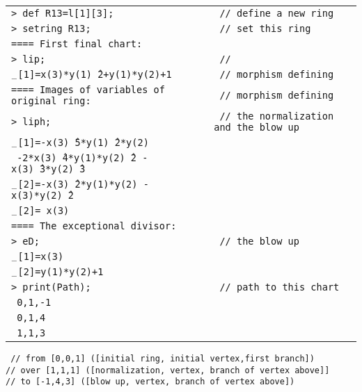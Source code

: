 \documentclass{article}
\begin{document}
\begin{table}[htbp]
	\begin{tabular}{ll}
		\texttt{> def R13=l[1][3]; } &     \texttt{ // define a new ring} \\
		\texttt{> setring R13;}  &  \texttt{ // set this ring}  \\
		\texttt{==== First final chart:}  &   \\
		\texttt{> lip;}  &  \texttt{ // }  \\
		\texttt{$_{-}$[1]=x(3)*y(1)\^\ \hspace*{-0.1cm}2+y(1)*y(2)+1}  & \texttt{ // morphism defining}   \\
		\texttt{==== Images of variables of original ring:}  & \texttt{ // morphism defining}  \\
		\texttt{> liph;}  &  \texttt{ // the normalization and the blow up }  \\
		\texttt{$_{-}$[1]=-x(3)\^\ \hspace*{-0.1cm}5*y(1)\^\ \hspace*{-0.1cm}2*y(2)}  &   \\
		\texttt{
		-2*x(3)\^\ \hspace*{-0.1cm}4*y(1)*y(2)\^\ \hspace*{-0.1cm}2
		-x(3)\^\ \hspace*{-0.1cm}3*y(2)\^\ \hspace*{-0.1cm}3}  &   \\
		\texttt{$_{-}$[2]=-x(3)\^\ \hspace*{-0.1cm}2*y(1)*y(2)
		-x(3)*y(2)\^\ \hspace*{-0.1cm}2}  &   \\
		\texttt{$_{-}$[2]= x(3)}  &   \\ 
		\texttt{==== The exceptional divisor:}  &   \\
		\texttt{> eD;}  &   \texttt{ // the blow up}  \\
		\texttt{$_{-}$[1]=x(3)} &   \\
		\texttt{$_{-}$[2]=y(1)*y(2)+1} &   \\
		\texttt{> print(Path);}  &   \texttt{ // path to this chart}   \\
		\texttt{ 0,1,-1}  &   \\
		\texttt{ 0,1,4}  &   \\
		\texttt{ 1,1,3}  &   \\
	\end{tabular}
	\texttt{ 
		// from [0,0,1] ([initial ring, initial vertex,first branch])  \\
		// over [1,1,1] ([normalization, vertex, branch of vertex above]] \\
		// to [-1,4,3] ([blow up, vertex, branch of vertex above]) 
		}
\end{table} 
\end{document}
